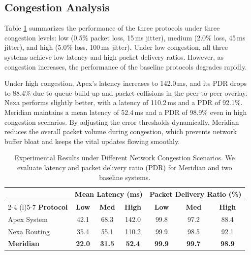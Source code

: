 \subsection{Congestion Analysis}
Table \ref{tab:results} summarizes the performance of the three protocols under three congestion levels: low (0.5\% packet loss, 15\,ms jitter), medium (2.0\% loss, 45\,ms jitter), and high (5.0\% loss, 100\,ms jitter). Under low congestion, all three systems achieve low latency and high packet delivery ratios. However, as congestion increases, the performance of the baseline protocols degrades rapidly.

Under high congestion, Apex's latency increases to 142.0\,ms, and its PDR drops to 88.4\% due to queue build-up and packet collisions in the peer-to-peer overlay. Nexa performs slightly better, with a latency of 110.2\,ms and a PDR of 92.1\%. Meridian maintains a mean latency of 52.4\,ms and a PDR of 98.9\% even in high congestion scenarios. By adjusting the error thresholds dynamically, Meridian reduces the overall packet volume during congestion, which prevents network buffer bloat and keeps the vital updates flowing smoothly.

\begin{table}[t]
  \centering
  \small
  \caption{Experimental Results under Different Network Congestion Scenarios. We evaluate latency and packet delivery ratio (PDR) for Meridian and two baseline systems.}
  \label{tab:results}
  \begin{tabular}{l ccc ccc}
    \toprule
    & \multicolumn{3}{c}{\textbf{Mean Latency (ms)}} & \multicolumn{3}{c}{\textbf{Packet Delivery Ratio (\%)}} \\
    \cmidrule(r){2-4} \cmidrule(l){5-7}
    \textbf{Protocol} & \textbf{Low} & \textbf{Med} & \textbf{High} & \textbf{Low} & \textbf{Med} & \textbf{High} \\
    \midrule
    Apex System & 42.1 & 68.3 & 142.0 & 99.8 & 97.2 & 88.4 \\
    Nexa Routing & 35.4 & 55.1 & 110.2 & 99.9 & 98.5 & 92.1 \\
    \textbf{Meridian} & \textbf{22.0} & \textbf{31.5} & \textbf{52.4} & \textbf{99.9} & \textbf{99.7} & \textbf{98.9} \\
    \bottomrule
  \end{tabular}
\end{table}
